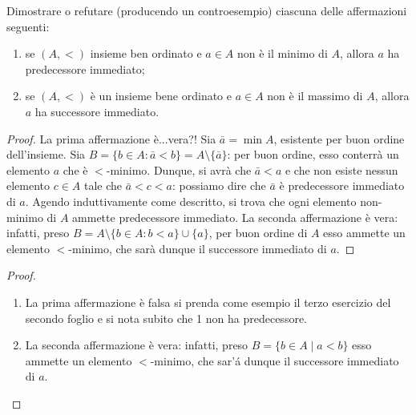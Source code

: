 \begin{exe}
  Dimostrare o refutare (producendo un controesempio) ciascuna delle affermazioni seguenti:
  \begin{enumerate}
    \item se \((A,<)\) insieme ben ordinato e \(a \in A\) non è il minimo di \(A\), allora \(a\) ha predecessore immediato;
    \item se \((A,<)\) è un insieme bene ordinato e \(a \in A\) non è il massimo di \(A\), allora \(a\) ha successore immediato.
  \end{enumerate}
\end{exe}
\begin{proof}
  La prima affermazione è...vera?! Sia \(\bar{a} = \min A\), esistente per buon ordine dell'insieme. Sia \(B = \lbrace b \in A \colon \bar{a} < b \rbrace = A \setminus \lbrace \bar{a} \rbrace\): per buon ordine, esso conterrà un elemento \(a\) che è \(<\)-minimo. Dunque, si avrà che \(\bar{a} < a\) e che non esiste nessun elemento \(c \in A\) tale che \(\bar{a} < c < a\): possiamo dire che \(\bar{a}\) è predecessore immediato di \(a\). Agendo induttivamente come descritto, si trova che ogni elemento non-minimo di \(A\) ammette predecessore immediato.
  La seconda affermazione è vera: infatti, preso \(B = A \setminus \lbrace b \in A \colon b < a\rbrace \cup \lbrace a \rbrace\), per buon ordine di \(A\) esso ammette un elemento \(<\)-minimo, che sarà dunque il successore immediato di \(a\).
\end{proof}
\begin{proof}\begin{enumerate}
\item La prima affermazione è falsa si prenda come esempio il terzo esercizio del secondo foglio e si nota subito che 1 non ha predecessore.
\item La seconda affermazione è vera: infatti, preso \(B= \lbrace b \in A \mid a<b \rbrace\) esso ammette un elemento \(<\)-minimo, che sar'\'a dunque il successore immediato di \(a\).
\end{enumerate}
\end{proof}
